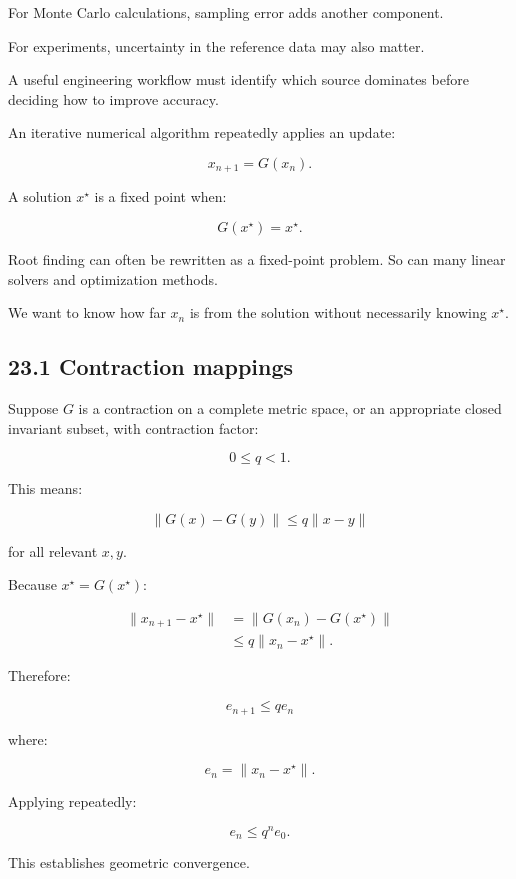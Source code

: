 For Monte Carlo calculations, sampling error adds another component.

For experiments, uncertainty in the reference data may also matter.

A useful engineering workflow must identify which source dominates before deciding how to improve accuracy.

An iterative numerical algorithm repeatedly applies an update:

\[ \boxed{ x_{n+1}=G(x_n) }. \]

A solution \(x^\star\) is a fixed point when:

\[ \boxed{ G(x^\star)=x^\star }. \]

Root finding can often be rewritten as a fixed-point problem. So can many linear solvers and optimization methods.

We want to know how far \(x_n\) is from the solution without necessarily knowing \(x^\star\).

\subsection{23.1 Contraction mappings}\label{02-foundations-ii-ch028-contraction-mappings}

\hypertarget{02-foundations-ii-ch028-contraction-mappings}{}

Suppose \(G\) is a contraction on a complete metric space, or an appropriate closed invariant subset, with contraction factor:

\[ 0\le q<1. \]

This means:

\[ \boxed{ \|G(x)-G(y)\| \le q\|x-y\| } \]

for all relevant \(x,y\).

Because \(x^\star=G(x^\star)\):

\[ \begin{aligned} \|x_{n+1}-x^\star\| &= \|G(x_n)-G(x^\star)\|\\ &\le q\|x_n-x^\star\|. \end{aligned} \]

Therefore:

\[ \boxed{ e_{n+1}\le qe_n } \]

where:

\[ e_n=\|x_n-x^\star\|. \]

Applying repeatedly:

\[ \boxed{ e_n\le q^ne_0 }. \]

This establishes geometric convergence.


